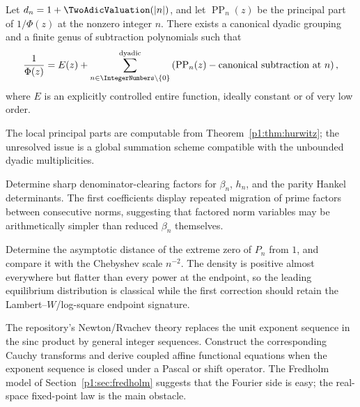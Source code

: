 \documentclass[11pt]{article}
\theoremstyle{definition}
\theoremstyle{remark}
\begin{document}
\begin{conjecture}\label{p1:conj:ML}
Let \(d_n=1+\TwoAdicValuation(|n|)\), and let \(\operatorname{PP}_n(z)\) be the principal part of
\(1/\Phi(z)\) at the nonzero integer \(n\).  There exists a canonical dyadic grouping and a
finite genus of subtraction polynomials such that
\begin{equation}
 \frac1{\Phi(z)}
 =E(z)+\sum_{n\in\IntegerNumbers\setminus\{0\}}^{\mathrm{dyadic}}
 \left(\operatorname{PP}_n(z)-\text{canonical subtraction at }n\right), \label{p1:eq:ML-conj}
\end{equation}
where \(E\) is an explicitly controlled entire function, ideally constant or of very low
order.
\end{conjecture}

The local principal parts are computable from Theorem~\ref{p1:thm:hurwitz}; the unresolved
issue is a global summation scheme compatible with the unbounded dyadic multiplicities.

\begin{problem}
Determine sharp denominator-clearing factors for \(\beta_n\), \(h_n\), and the parity
Hankel determinants.  The first coefficients display repeated migration of prime factors
between consecutive norms, suggesting that factored norm variables may be arithmetically
simpler than reduced \(\beta_n\) themselves.
\end{problem}

\begin{problem}
Determine the asymptotic distance of the extreme zero of \(P_n\) from \(1\), and compare it
with the Chebyshev scale \(n^{-2}\).  The density is positive almost everywhere but flatter
than every power at the endpoint, so the leading equilibrium distribution is classical
while the first correction should retain the Lambert--\(W\)/log-square endpoint signature.
\end{problem}

\begin{problem}
The repository's Newton/Rvachev theory replaces the unit exponent sequence in the sinc
product by general integer sequences.  Construct the corresponding Cauchy transforms and
derive coupled affine functional equations when the exponent sequence is closed under a
Pascal or shift operator.  The Fredholm model of Section~\ref{p1:sec:fredholm} suggests that
the Fourier side is easy; the real-space fixed-point law is the main obstacle.
\end{problem}
\end{document}
